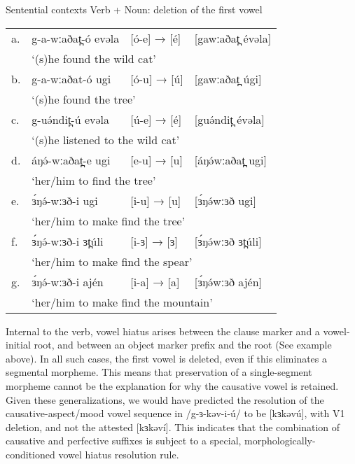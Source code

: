 \ea Sentential contexts Verb + Noun: deletion of the first vowel 
\begin{tabular}[t]{llll}
a.&	g-a-wːaðat̪-ó  evəla	&	[ó-e] → [é]	&	[gawːaðat̪ évəla]\\
& \multicolumn{3}{l}{‘(s)he found the wild cat’}\\
b.&		g-a-wːaðat-ó  ugi&	[ó-u] →	[ú]	&	[gawːaðat̪ úgi]\\
& \multicolumn{3}{l}{‘(s)he found the tree’}\\
c.&		g-uə́ndit̪-ú evəla	&	[ú-e] →	[é]	&	[guə́ndit̪ évəla] \\
& \multicolumn{3}{l}{‘(s)he listened to the wild cat’}\\
d.&		áŋə́-wːaðat̪-e ugi	&	[e-u] →	[u]	&	[áŋə́wːaðat̪ ugi]\\
& \multicolumn{3}{l}{‘her/him to find the tree’}\\
e.&		ɜ́ŋə́-wːɜð-i ugi	&	[i-u] →	[u]	&	[ɜ́ŋə́wːɜð ugi]	\\
& \multicolumn{3}{l}{‘her/him to make find the tree’}\\
f.&		ɜ́ŋə́-wːɜð-i ɜt̪úli	&	[i-ɜ] →	[ɜ]	&	[ɜ́ŋə́wːɜð ɜt̪úli]\\
& \multicolumn{3}{l}{‘her/him to make find the spear’}\\
g.&	ɜ́ŋə́-wːɜð-i ajén		&	[i-a] →	[a]	&	[ɜ́ŋə́wːɜð ajén] \\
& \multicolumn{3}{l}{‘her/him to make find the mountain’}\\
\end{tabular}
\z 
Internal to the verb, vowel hiatus arises between the clause marker and a vowel-initial root, and between an object marker prefix and the root (See example  above). In all such cases, the first vowel is deleted, even if this eliminates a segmental morpheme. This means that preservation of a single-segment morpheme cannot be the explanation for why the causative vowel is retained.  Given these generalizations, we would have predicted the resolution of the causative-aspect/mood vowel sequence in  /g-ɜ-kəv-i-ú/  to be [kɜkəvú], with V1 deletion, and not the attested [kɜkəví]. This indicates that the combination of causative and perfective suffixes is subject to a special, morphologically-conditioned vowel hiatus resolution rule.
  

